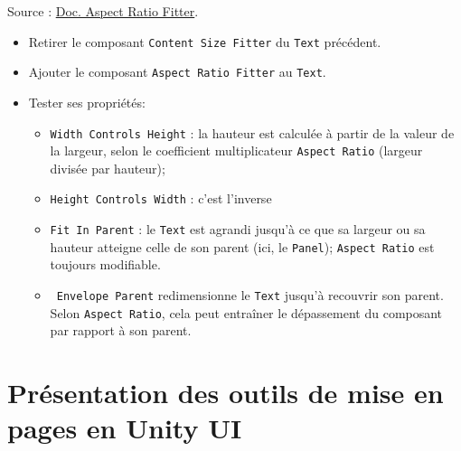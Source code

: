 \documentclass[a4paper,10pt]{article}
\newenvironment{solution}%
{\begin{tcolorbox}[breakable,colback=red!5!white,colframe=red!75!black,title=Solution]}%
{\end{tcolorbox}}
\begin{document}
\begin{itemize}
\ifversionenseignant
\begin{solution}
	Source : \href{https://docs.unity3d.com/Packages/com.unity.ugui@1.0/manual/script-AspectRatioFitter.html}{Doc. Aspect Ratio Fitter}.
	
	\begin{itemize}
		\item Retirer le composant \texttt{Content Size Fitter} du \texttt{Text} précédent.
		\item Ajouter le composant \texttt{Aspect Ratio Fitter} au \texttt{Text}.
		\item Tester ses propriétés:
		\begin{itemize}
			\item 	\texttt{Width Controls Height} : la hauteur est calculée à partir de la valeur de la largeur, selon le coefficient multiplicateur \texttt{Aspect Ratio} (largeur divisée par hauteur);
			\item \texttt{Height Controls Width} : c'est l'inverse			
			\item \texttt{Fit In Parent} : le \texttt{Text} est agrandi jusqu'à ce que sa largeur ou sa hauteur atteigne celle de son parent (ici, le \texttt{Panel}); \texttt{Aspect Ratio} est toujours modifiable.
			\item\texttt{ Envelope Parent} redimensionne le \texttt{Text} jusqu'à recouvrir son parent. Selon \texttt{Aspect Ratio}, cela peut entraîner le dépassement du composant par rapport à son parent.
		\end{itemize}	
	\end{itemize}
	
\end{solution}
\fi 
	  
\end{itemize}

\section{Présentation des outils de mise en pages en Unity UI}
\end{document}
